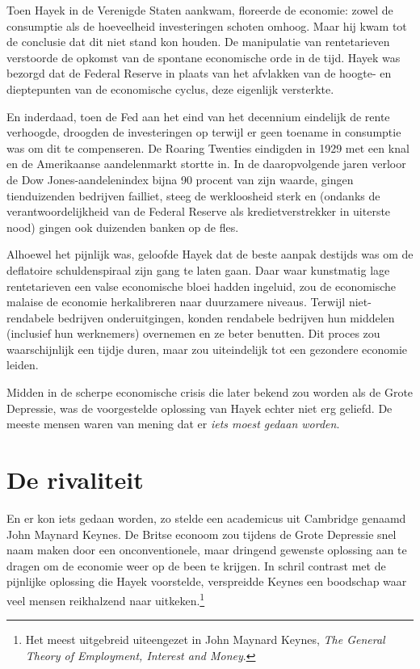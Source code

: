 \documentclass[
  a5paper,
  smalldemyvopaper,11pt,twoside,onecolumn,openright,extrafontsizes,
hidelinks]{memoir}
\begin{document}
Toen Hayek in de Verenigde Staten aankwam, floreerde de economie: zowel
de consumptie als de hoeveelheid investeringen schoten omhoog. Maar hij
kwam tot de conclusie dat dit niet stand kon houden. De manipulatie van
rentetarieven verstoorde de opkomst van de spontane economische orde in
de tijd. Hayek was bezorgd dat de Federal Reserve in plaats van het
afvlakken van de hoogte- en dieptepunten van de economische cyclus, deze
eigenlijk versterkte.

En inderdaad, toen de Fed aan het eind van het decennium eindelijk de
rente verhoogde, droogden de investeringen op terwijl er geen toename in
consumptie was om dit te compenseren. De Roaring Twenties eindigden in
1929 met een knal en de Amerikaanse aandelenmarkt stortte in. In de
daaropvolgende jaren verloor de Dow Jones-aandelenindex bijna 90 procent
van zijn waarde, gingen tienduizenden bedrijven failliet, steeg de
werkloosheid sterk en (ondanks de verantwoordelijkheid van de Federal
Reserve als kredietverstrekker in uiterste nood) gingen ook duizenden
banken op de fles.

Alhoewel het pijnlijk was, geloofde Hayek dat de beste aanpak destijds
was om de deflatoire schuldenspiraal zijn gang te laten gaan. Daar waar
kunstmatig lage rentetarieven een valse economische bloei hadden
ingeluid, zou de economische malaise de economie herkalibreren naar
duurzamere niveaus. Terwijl niet-rendabele bedrijven onderuitgingen,
konden rendabele bedrijven hun middelen (inclusief hun werknemers)
overnemen en ze beter benutten. Dit proces zou waarschijnlijk een tijdje
duren, maar zou uiteindelijk tot een gezondere economie leiden.

Midden in de scherpe economische crisis die later bekend zou worden als
de Grote Depressie, was de voorgestelde oplossing van Hayek echter niet
erg geliefd. De meeste mensen waren van mening dat er \emph{iets moest
gedaan worden}.

\vspace{-1em}

\section{De rivaliteit}\label{de-rivaliteit}

En er kon iets gedaan worden, zo stelde een academicus uit Cambridge
genaamd John Maynard Keynes. De Britse econoom zou tijdens de Grote
Depressie snel naam maken door een onconventionele, maar dringend
gewenste oplossing aan te dragen om de economie weer op de been te
krijgen. In schril contrast met de pijnlijke oplossing die Hayek
voorstelde, verspreidde Keynes een boodschap waar veel mensen
reikhalzend naar uitkeken.\footnote{Het meest uitgebreid uiteengezet in
  John Maynard Keynes, \emph{The General Theory of Employment, Interest
  and Money}.}
\end{document}
